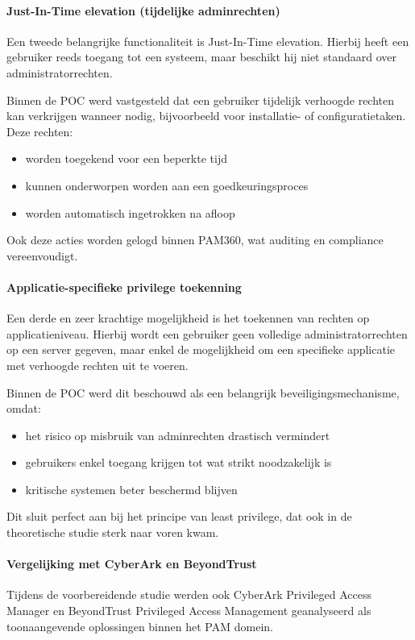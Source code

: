\paragraph{Just-In-Time elevation (tijdelijke adminrechten)}
Een tweede belangrijke functionaliteit is Just-In-Time elevation. Hierbij heeft een gebruiker reeds toegang tot een systeem, maar beschikt hij niet standaard over administratorrechten.

Binnen de POC werd vastgesteld dat een gebruiker tijdelijk verhoogde rechten kan verkrijgen wanneer nodig, bijvoorbeeld voor installatie- of configuratietaken. Deze rechten:
\begin{itemize}
	\item worden toegekend voor een beperkte tijd 
	\item kunnen onderworpen worden aan een goedkeuringsproces 
	\item worden automatisch ingetrokken na afloop 
\end{itemize}
Ook deze acties worden gelogd binnen PAM360, wat auditing en compliance vereenvoudigt.
\paragraph{Applicatie-specifieke privilege toekenning}
Een derde en zeer krachtige mogelijkheid is het toekennen van rechten op applicatieniveau. Hierbij wordt een gebruiker geen volledige administratorrechten op een server gegeven, maar enkel de mogelijkheid om een specifieke applicatie met verhoogde rechten uit te voeren.

Binnen de POC werd dit beschouwd als een belangrijk beveiligingsmechanisme, omdat:
\begin{itemize}
	\item het risico op misbruik van adminrechten drastisch vermindert 
	\item gebruikers enkel toegang krijgen tot wat strikt noodzakelijk is 
	\item kritische systemen beter beschermd blijven 
\end{itemize}
Dit sluit perfect aan bij het principe van least privilege, dat ook in de theoretische studie sterk naar voren kwam.
\paragraph{Vergelijking met CyberArk en BeyondTrust}
Tijdens de voorbereidende studie werden ook CyberArk Privileged Access Manager en BeyondTrust Privileged Access Management geanalyseerd als toonaangevende oplossingen binnen het PAM domein.

